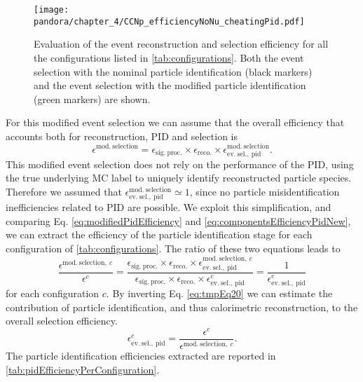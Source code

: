 \begin{figure}
    \centering
    \texttt{[image: pandora/chapter\_4/CCNp\_efficiencyNoNu\_cheatingPid.pdf]}
    \caption[Evaluation of the reconstruction and selection efficiency for different configurations with the modified event selection]{Evaluation of the event reconstruction and selection efficiency for all the configurations listed in \autoref{tab:configurations}. Both the event selection with the nominal particle identification (black markers) and the event selection with the modified particle identification (green markers) are shown. }
    \label{fig:CCNp_efficiencyNoNu_cheatingPid}
\end{figure}

For this modified event selection we can assume that the overall efficiency that accounts both for reconstruction, PID and selection is \begin{equation}
    \epsilon^\mathrm{mod.\ selection} = \epsilon_\mathrm{sig.\ proc.} \times 
        \epsilon_\mathrm{reco.} \times 
        \epsilon_\mathrm{ev.\ sel.,\ pid}^\mathrm{mod.\ selection}. 
        \label{eq:modifiedPidEfficiency}
\end{equation} This modified event selection does not rely on the performance of the PID, using the true underlying MC label to uniquely identify reconstructed particle species. Therefore we assumed that  $\epsilon_\mathrm{ev.\ sel.,\ pid}^\mathrm{mod.\ selection}\simeq1$, since no particle misidentification inefficiencies related to PID are possible. We exploit this simplification, and comparing Eq. \eqref{eq:modifiedPidEfficiency} and \eqref{eq:componentsEfficiencyPidNew}, we can extract the efficiency of the particle identification stage for each configuration of \autoref{tab:configurations}. The ratio of these two equations leads to \begin{equation}
    \frac{
    \epsilon^{\mathrm{mod.\ selection,}\ c}
    }{
    \epsilon^{c}
    } = \frac{
    \epsilon_\mathrm{sig.\ proc.} \times 
    \epsilon_\mathrm{reco.} \times 
    \epsilon_\mathrm{ev.\ sel.,\ pid}^{\mathrm{mod.\ selection,}\ c}
    }{
    \epsilon_\mathrm{sig.\ proc.} \times 
    \epsilon_\mathrm{reco.} \times 
    \epsilon_\mathrm{ev.\ sel.,\ pid}^c
    } = \frac1{\epsilon_\mathrm{ev.\ sel.,\ pid}^c} \label{eq:tmpEq20}
\end{equation} for each configuration $c$. By inverting Eq. \eqref{eq:tmpEq20} we can estimate the contribution of particle identification, and thus calorimetric reconstruction, to the overall selection efficiency. \begin{equation}
    \epsilon_\mathrm{ev.\ sel.,\ pid}^c = \frac{
    \epsilon^{c}
    }{
    \epsilon^{\mathrm{mod.\ selection,}\ c}
    }. \label{eq:pidComputation}
\end{equation} The particle identification efficiencies extracted are reported in \autoref{tab:pidEfficiencyPerConfiguration}. 


